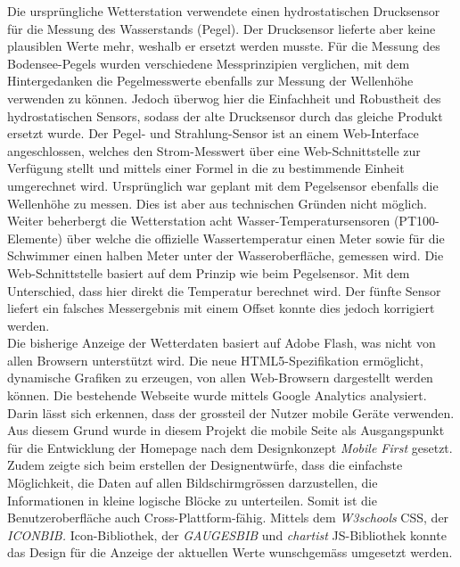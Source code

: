 \documentclass[10pt]{article}
\begin{document}
\begin{multicols}{2}
Die ursprüngliche Wetterstation verwendete einen hydrostatischen Drucksensor für die Messung des Wasserstands (Pegel). Der Drucksensor lieferte aber keine plausiblen Werte mehr, weshalb er ersetzt werden musste. Für die Messung des Bodensee-Pegels wurden verschiedene Messprinzipien verglichen, mit dem Hintergedanken die Pegelmesswerte ebenfalls zur Messung der Wellenhöhe verwenden zu können. Jedoch überwog hier die Einfachheit und Robustheit des hydrostatischen Sensors, sodass der alte Drucksensor durch das gleiche Produkt ersetzt wurde. Der Pegel- und Strahlung-Sensor ist an einem Web-Interface angeschlossen, welches den Strom-Messwert über eine Web-Schnittstelle zur Verfügung stellt und mittels einer Formel in die zu bestimmende Einheit umgerechnet wird. Ursprünglich war geplant mit dem Pegelsensor ebenfalls die Wellenhöhe zu messen. Dies ist aber aus technischen Gründen nicht möglich.\\ 
Weiter beherbergt die Wetterstation acht Wasser-Temperatursensoren (PT100-Elemente) über welche die offizielle Wassertemperatur einen Meter sowie für die Schwimmer einen halben Meter unter der Wasseroberfläche, gemessen wird. Die Web-Schnittstelle basiert auf dem Prinzip wie beim Pegelsensor. Mit dem Unterschied, dass hier direkt die Temperatur berechnet wird. Der fünfte Sensor liefert ein falsches Messergebnis mit einem Offset konnte dies jedoch korrigiert werden.\\
Die bisherige Anzeige der Wetterdaten basiert auf Adobe Flash, was nicht von allen Browsern unterstützt wird. Die neue HTML5-Spezifikation ermöglicht, dynamische Grafiken zu erzeugen, von allen Web-Browsern dargestellt werden können. Die bestehende Webseite wurde mittels Google Analytics analysiert. Darin lässt sich erkennen, dass der grossteil der Nutzer mobile Geräte verwenden. Aus diesem Grund wurde in diesem Projekt die mobile Seite als Ausgangspunkt für die Entwicklung der Homepage nach dem Designkonzept \textit{Mobile First} gesetzt. Zudem zeigte sich beim erstellen der Designentwürfe, dass die einfachste Möglichkeit, die Daten auf allen Bildschirmgrössen darzustellen, die Informationen in kleine logische Blöcke zu unterteilen. Somit ist die Benutzeroberfläche auch Cross-Plattform-fähig. Mittels dem \textit{W3schools} CSS, der \textit{ICONBIB.} Icon-Bibliothek, der \textit{GAUGESBIB} und \textit{chartist} JS-Bibliothek konnte das Design für die Anzeige der aktuellen Werte wunschgemäss umgesetzt werden.

\end{multicols}
\end{document}
